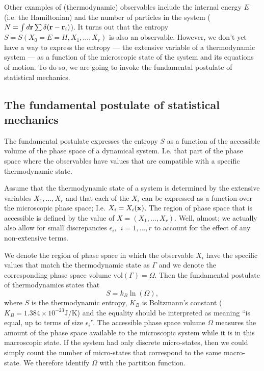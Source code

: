 \documentclass{article}
\begin{document}
Other examples of (thermodynamic) observables include the internal energy $E$ (i.e. the Hamiltonian) and the number of particles in the system ($N = \int d{\bf r}\sum\delta({\bf r}-{\bf r}_i)$).
It turns out that the entropy $S=S(X_0=E=H,X_1,\ldots,X_r)$ is also an observable. However, we don't yet have a way to express the entropy --- the extensive variable of a thermodynamic system --- as a function of the microscopic state of the system and its equations of motion. To do so, we are going to invoke the fundamental postulate of statistical mechanics.

\subsection*{The fundamental postulate of statistical mechanics}
The fundamental postulate expresses the entropy $S$ as a function of the accessible volume of the phase space of a dynamical system. I.e. that part of the phase space where the observables have values that are compatible with a specific thermodynamic state.

Assume that the thermodynamic state of a system is determined by the extensive variables $X_1,\ldots,X_r$ and that each of the $X_i$ can be expressed as a function over the microscopic phase space; I.e. $X_i = X_i({\bf x})$.
The region of phase space that is accessible is defined by the value of $X = (X_1,\ldots,X_r)$. Well, almost; we actually also allow for small discrepancies $\epsilon_i,~~i=1,\ldots,r$ to account for the effect of any non-extensive terms.

We denote the region of phase space in which the observable $X_i$ have the specific values that match the thermodynamic state as $\Gamma$ and we denote the corresponding phase space volume $\text{vol}(\Gamma)=\Omega$. Then the fundamental postulate of thermodynamics states that
\begin{equation}
	S = k_B\ln(\Omega),
	\label{eqS}
\end{equation}
where $S$ is the thermodynamic entropy, $K_B$ is Boltzmann's constant ($K_B = 1.384\times10^{-23}$J/K) and the equality should be interpreted as meaning ``is equal, up to terms of size $\epsilon_i$''. The accessible phase space volume $\Omega$ measures the amount of the phase space available to the microscopic system while it is in this macroscopic state. If the system had only discrete micro-states, then we could simply count the number of micro-states that correspond to the same macro-state. We therefore identify $\Omega$ with the partition function.
\end{document}
